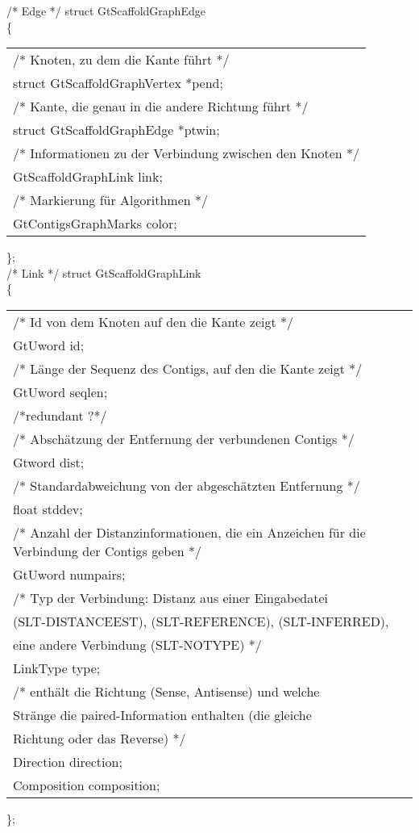 \documentclass[a4paper,10pt,parskip]{scrartcl}
\begin{document}
/* Edge */
struct GtScaffoldGraphEdge\\
\{\\
\begin{tabular}{l}
  /*  Knoten, zu dem die Kante führt */\\
  struct GtScaffoldGraphVertex *pend;\\ 
  /* Kante, die genau in die andere Richtung führt */\\
  struct GtScaffoldGraphEdge *ptwin;\\ 
  /* Informationen zu der Verbindung zwischen den Knoten */\\
  GtScaffoldGraphLink link;\\ 
  /* Markierung für Algorithmen */\\
  GtContigsGraphMarks color;\\ 
\end{tabular}
\};\\

/* Link */
struct GtScaffoldGraphLink\\
\{\\
\begin{tabular}{l}
  /* Id von dem Knoten auf den die Kante zeigt */\\
  GtUword id;\\ 	
  /* Länge der Sequenz des Contigs, auf den die Kante zeigt */\\
  GtUword seqlen;\\ 
  /*redundant ?*/\\

  /* Abschätzung der Entfernung der verbundenen Contigs */\\
  Gtword dist;\\
  /* Standardabweichung von der abgeschätzten Entfernung */\\
  float stddev;\\
  /* Anzahl der Distanzinformationen, die ein Anzeichen für die
  Verbindung der Contigs geben */\\
  GtUword numpairs;\\
  /* Typ der Verbindung: Distanz aus einer Eingabedatei\\
     (SLT-DISTANCEEST), (SLT-REFERENCE), (SLT-INFERRED),\\
     eine andere Verbindung (SLT-NOTYPE) */\\	    
  LinkType type;\\
  /* enthält die Richtung (Sense, Antisense) und welche\\
     Stränge die paired-Information enthalten (die gleiche\\
     Richtung oder das Reverse) */\\
  Direction direction;\\
  Composition composition;
\end{tabular}
\};
\end{document}
